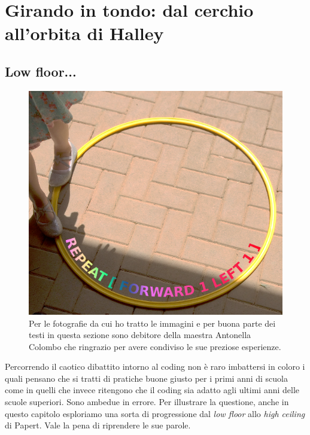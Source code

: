 \chapter{Girando in tondo: dal cerchio all'orbita di Halley} \label{cap:cerchio}

\section{Low floor...}

\begin{figure}[h]
   \centering
   \includegraphics[width=12.0cm]{./images/cerchio/PiccolomanualeLibreLogo5-img1.png}
   \caption{Per le fotografie da cui ho tratto le immagini e per buona parte dei testi in questa sezione sono debitore della maestra Antonella Colombo che ringrazio per avere condiviso le sue preziose esperienze.}
   \label{bambina-gira}
\end{figure}

Percorrendo il caotico dibattito intorno al coding non è raro imbattersi in coloro i quali pensano che si tratti di pratiche buone giusto per i primi anni di scuola come in quelli che invece ritengono che il coding sia adatto agli ultimi anni delle scuole superiori. Sono ambedue in errore. Per illustrare la questione, anche in questo capitolo esploriamo una sorta di progressione dal \textit{low floor} allo \textit{high ceiling} di Papert. Vale la pena di riprendere le sue parole. 

